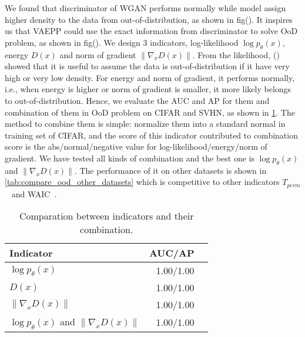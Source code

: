 We found that discriminator of WGAN performs normally while model assign higher density to the data from out-of-distribution, as shown in fig(). It inspires us that VAEPP could use the exact information from discriminator to solve OoD problem, as shown in fig(). We design 3 indicators, log-likelihood $\log p_\theta(x)$, energy $D(x)$ and norm of gradient $\|\nabla_{x} D(x)\|$. From the likelihood, () showed that it is useful to assume the data is out-of-distribution if it have very high or very low density. For energy and norm of gradient, it performs normally, i.e., when energy is higher or norm of gradient is smaller, it more likely belongs to out-of-distribution. Hence, we evaluate the AUC and AP for them and combination of them in OoD problem on CIFAR and SVHN, as shown in \cref{tab:compare_ood}. The method to combine them is simple: normalize them into a standard normal in training set of CIFAR, and the score of this indicator contributed to combination score is the abs/normal/negative value for log-likelihood/energy/norm of gradient. We have tested all kinds of combination and the best one is $\log p_\theta(x)$ and $\|\nabla_x D(x)\|$. The performance of it on other datasets is shown in \cref{tab:compare_ood_other_datasets} which is competitive to other indicators $T_{perm}$~\cite{song2017pixeldefend} and WAIC~\cite{choi2018waic}. 
\begin{table}[tb]
\centering
\begin{tabular}{lrr}  
\toprule
Indicator  & AUC/AP \\
\midrule
$\log p_\theta(x)$   &  1.00/1.00      \\
$D(x)$               &  1.00/1.00      \\
$\|\nabla_x D(x)\|$  &  1.00/1.00      \\
$\log p_\theta(x)$ and $\|\nabla_x D(x)\|$ & 1.00/1.00 \\
\bottomrule
\end{tabular}
\caption{Comparation between indicators and their combination.}
\label{tab:compare_ood}
\end{table}
